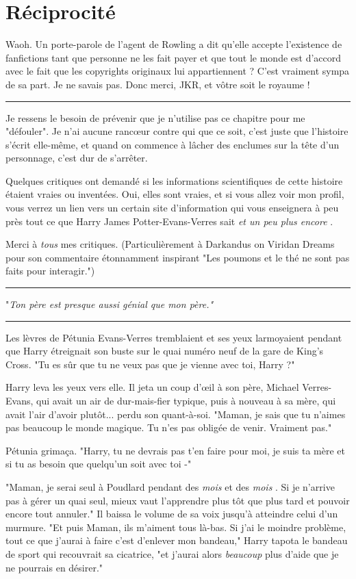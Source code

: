 
\chapter{Réciprocité}

Waoh. Un porte-parole de l'agent de Rowling a dit qu'elle accepte l'existence de fanfictions tant que personne ne les fait payer et que tout le monde est d'accord avec le fait que les copyrights originaux lui appartiennent ? C'est vraiment sympa de sa part. Je ne savais pas. Donc merci, JKR, et vôtre soit le royaume !
\par\noindent\rule{\textwidth}{0.4pt}
Je ressens le besoin de prévenir que je n'utilise pas ce chapitre pour me "défouler". Je n'ai aucune rancœur contre qui que ce soit, c'est juste que l'histoire s'écrit elle-même, et quand on commence à lâcher des enclumes sur la tête d'un personnage, c'est dur de s'arrêter.

Quelques critiques ont demandé si les informations scientifiques de cette histoire étaient vraies ou inventées. Oui, elles sont vraies, et si vous allez voir mon profil, vous verrez un lien vers un certain site d'information qui vous enseignera à peu près tout ce que Harry James Potter-Evans-Verres sait \emph{et un peu plus encore} .

Merci à \emph{tous}  mes critiques. (Particulièrement à Darkandus on Viridan Dreams pour son commentaire étonnamment inspirant "Les poumons et le thé ne sont pas faits pour interagir.")
\par\noindent\rule{\textwidth}{0.4pt}
"\emph{Ton père est presque aussi génial que mon père."} 
\par\noindent\rule{\textwidth}{0.4pt}
Les lèvres de Pétunia Evans-Verres tremblaient et ses yeux larmoyaient pendant que Harry étreignait son buste sur le quai numéro neuf de la gare de King's Cross. "Tu es sûr que tu ne veux pas que je vienne avec toi, Harry ?"

Harry leva les yeux vers elle. Il jeta un coup d'œil à son père, Michael Verres-Evans, qui avait un air de dur-mais-fier typique, puis à nouveau à sa mère, qui avait l'air d'avoir plutôt... perdu son quant-à-soi. "Maman, je sais que tu n'aimes pas beaucoup le monde magique. Tu n'es pas obligée de venir. Vraiment pas."

Pétunia grimaça. "Harry, tu ne devrais pas t'en faire pour moi, je suis ta mère et si tu as besoin que quelqu'un soit avec toi -"

"Maman, je serai seul à Poudlard pendant des \emph{mois}  et des \emph{mois} . Si je n'arrive pas à gérer un quai seul, mieux vaut l'apprendre plus tôt que plus tard et pouvoir encore tout annuler." Il baissa le volume de sa voix jusqu'à atteindre celui d'un murmure. "Et puis Maman, ils m'aiment tous là-bas. Si j'ai le moindre problème, tout ce que j'aurai à faire c'est d'enlever mon bandeau," Harry tapota le bandeau de sport qui recouvrait sa cicatrice, "et j'aurai alors \emph{beaucoup}  plus d'aide que je ne pourrais en désirer."

